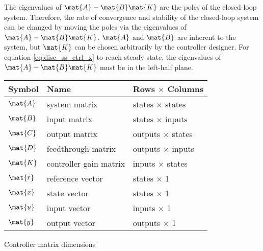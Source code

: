 The eigenvalues of $\mat{A} - \mat{B}\mat{K}$ are the poles of the closed-loop
\gls{system}. Therefore, the rate of convergence and stability of the
closed-loop \gls{system} can be changed by moving the poles via the eigenvalues
of $\mat{A} - \mat{B}\mat{K}$. $\mat{A}$ and $\mat{B}$ are inherent to the
\gls{system}, but $\mat{K}$ can be chosen arbitrarily by the controller
designer. For equation \eqref{eq:disc_ss_ctrl_x} to reach steady-state, the
eigenvalues of $\mat{A} - \mat{B}\mat{K}$ must be in the left-half plane.
\begin{booktable}
  \begin{tabular}{|lll|}
    \hline
    \rowcolor{headingbg}
    \textbf{Symbol} & \textbf{Name} & \textbf{Rows $\times$ Columns} \\
    \hline
    $\mat{A}$ & system matrix & states $\times$ states \\
    $\mat{B}$ & input matrix & states $\times$ inputs \\
    $\mat{C}$ & output matrix & outputs $\times$ states \\
    $\mat{D}$ & feedthrough matrix & outputs $\times$ inputs \\
    $\mat{K}$ & controller gain matrix & inputs $\times$ states \\
    $\mat{r}$ & \gls{reference} vector & states $\times$ 1 \\
    $\mat{x}$ & state vector & states $\times$ 1 \\
    $\mat{u}$ & input vector & inputs $\times$ 1 \\
    $\mat{y}$ & output vector & outputs $\times$ 1 \\
    \hline
  \end{tabular}
  \caption{Controller matrix dimensions}
\end{booktable}
